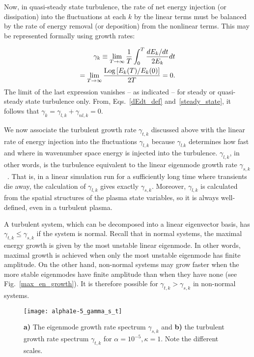 \documentclass[twocolumn,showkeys,superscriptaddress]{revtex4}
\def\beqar{\begin{eqnarray}}
\def\eeqar{\end{eqnarray}}
\begin{document}
Now, in quasi-steady state turbulence, the rate of net energy injection (or dissipation) into the fluctuations at each $k$ by the linear terms must be balanced by
the rate of energy removal (or deposition) from the nonlinear terms. This may be represented formally using growth rates:

\beqar
\label{steady_state}
\gamma_k \equiv  \displaystyle\lim_{T \to \infty} \frac{1}{T} \int_0^T \frac{dE_k/dt}{2 E_k} dt \nonumber \\
= \displaystyle\lim_{T \to \infty} \frac{{\rm{Log}}\left[ E_k(T)/E_k(0) \right]}{2 T} = 0.
\eeqar
The limit of the last expression vanishes -- as indicated -- for steady or quasi-steady state turbulence only.
From, Eqs.~\ref{dEdt_def} and~\ref{steady_state}, it follows that $ \gamma_k = \gamma_{l,k} + \gamma_{nl,k} = 0$.

We now associate the turbulent growth rate $\gamma_{t,k}$ discussed above with the linear rate of energy injection into the fluctuations $\gamma_{l,k}$ because $\gamma_{l.k}$
determines how fast and where in wavenumber space energy is injected into the turbulence.
$\gamma_{l,k}$, in other words, is the turbulence equivalent to the linear eigenmode growth rate $\gamma_{s,k}$~\cite{friedman2012b,terry2006b}. 
That is, in a linear simulation run for a sufficiently long time where transients die away, the calculation of $\gamma_{l,k}$ gives exactly $\gamma_{s,k}$.
Moreover, $\gamma_{l,k}$ is calculated from the spatial structures of the plasma state variables, so it is always well-defined, even in a turbulent plasma.

A turbulent system, which can be decomposed into a linear eigenvector basis, has $\gamma_{t,k} \le \gamma_{s,k}$ if the system is normal. Recall that in normal systems, the maximal
energy growth is given by the most unstable linear eigenmode. In other words, maximal growth is achieved when only the most unstable eigenmode has finite amplitude.
On the other hand, non-normal systems may grow faster when the more stable eigenmodes have finite amplitude than when they have none (see Fig.~\ref{max_en_growth}). 
It is therefore possible for $\gamma_{t,k} > \gamma_{s,k}$ in non-normal systems. 

\begin{figure}
\centerline{\texttt{[image: alpha1e-5\_gamma\_s\_t]}}
\caption{{\bf a)} The eigenmode growth rate spectrum $\gamma_{s,k}$ and {\bf b)} the turbulent growth rate spectrum $\gamma_{t,k}$ for $\alpha = 10^{-5}, \kappa=1$. Note the different scales.}
\label{alpha1e-5_gamma_s_t}
\end{figure}
\end{document}
